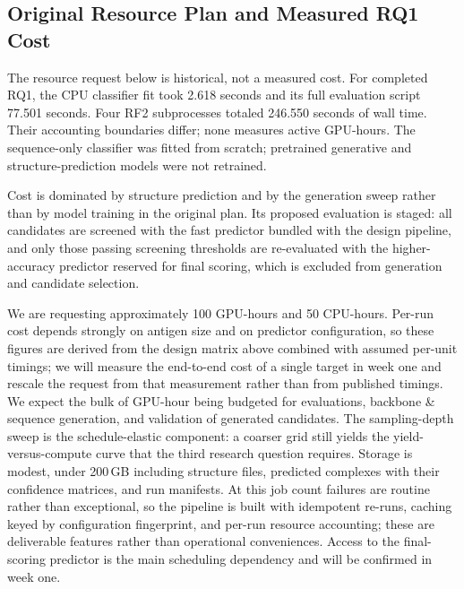 \documentclass[11pt, logo, nonumbering]{preprint}
\begin{document}
\subsection{Original Resource Plan and Measured RQ1 Cost}
The resource request below is historical, not a measured cost. For completed
RQ1, the CPU classifier fit took 2.618 seconds and its full evaluation script
77.501 seconds. Four RF2 subprocesses totaled 246.550 seconds of wall time.
Their accounting boundaries differ; none measures active GPU-hours. The
sequence-only classifier was fitted from scratch; pretrained generative and
structure-prediction models were not retrained.

Cost is dominated by structure prediction and by the generation sweep rather
than by model training in the original plan. Its proposed evaluation is
staged: all candidates are screened with the fast predictor bundled with the
design pipeline, and only those passing screening thresholds are re-evaluated
with the higher-accuracy predictor reserved for final scoring, which is excluded
from generation and candidate selection.

\noindent We are requesting approximately 100 GPU-hours and 50 CPU-hours.  Per-run cost depends strongly on antigen size and on predictor configuration, so these figures are derived from the design matrix above combined with assumed per-unit timings; we will measure the end-to-end cost of a single target in week one and rescale the request from that measurement rather than from published timings. We expect the bulk of GPU-hour being budgeted for evaluations, backbone \& sequence generation, and validation of generated candidates. The sampling-depth sweep is the schedule-elastic component: a coarser grid still yields the yield-versus-compute curve that the third research question requires. Storage is modest, under 200\,GB including structure files, predicted complexes with their confidence matrices, and run manifests. At this job count failures are routine rather than exceptional, so the pipeline is built with idempotent re-runs, caching keyed by configuration fingerprint, and per-run resource accounting; these are deliverable features rather than operational conveniences. Access to the final-scoring predictor is the main scheduling dependency and will be confirmed in week one.

\end{document}
